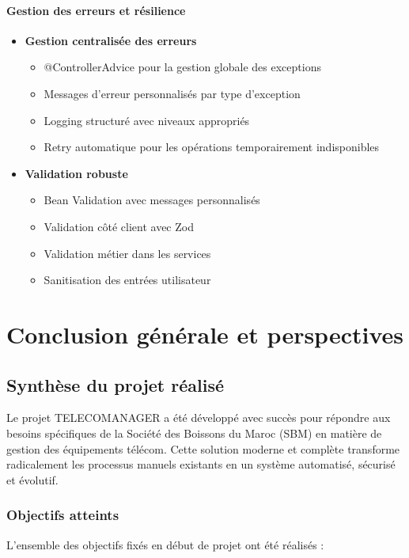 \documentclass[12pt,a4paper]{report}
\begin{document}
\subsubsection{Gestion des erreurs et résilience}
\begin{itemize}
\item \textbf{Gestion centralisée des erreurs}
  \begin{itemize}
  \item @ControllerAdvice pour la gestion globale des exceptions
  \item Messages d'erreur personnalisés par type d'exception
  \item Logging structuré avec niveaux appropriés
  \item Retry automatique pour les opérations temporairement indisponibles
  \end{itemize}

\item \textbf{Validation robuste}
  \begin{itemize}
  \item Bean Validation avec messages personnalisés
  \item Validation côté client avec Zod
  \item Validation métier dans les services
  \item Sanitisation des entrées utilisateur
  \end{itemize}
\end{itemize}
\chapter{Conclusion générale et perspectives}

\section{Synthèse du projet réalisé}
Le projet TELECOMANAGER a été développé avec succès pour répondre aux besoins spécifiques de la Société des Boissons du Maroc (SBM) en matière de gestion des équipements télécom. Cette solution moderne et complète transforme radicalement les processus manuels existants en un système automatisé, sécurisé et évolutif.

\subsection{Objectifs atteints}
L'ensemble des objectifs fixés en début de projet ont été réalisés :
\end{document}
